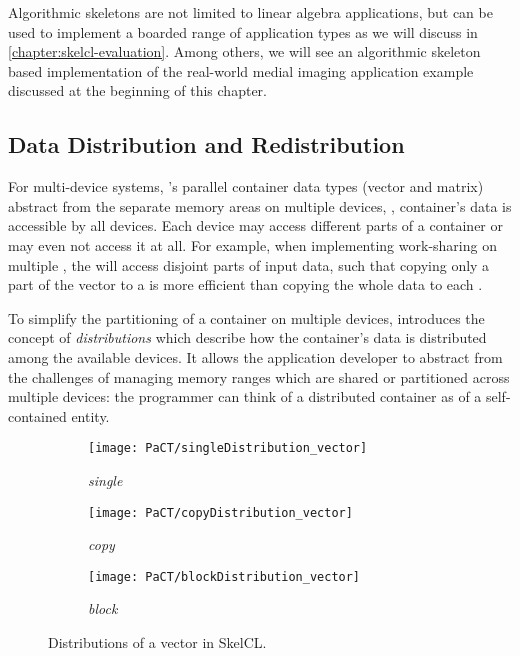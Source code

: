 \noindent
Algorithmic skeletons are not limited to linear algebra applications, but can be used to implement a boarded range of application types as we will discuss in \autoref{chapter:skelcl-evaluation}.
Among others, we will see an algorithmic skeleton based implementation of the real-world medial imaging application example discussed at the beginning of this chapter.


\subsection{Data Distribution and Redistribution}
\label{section:skelcl-programming-model:distribution}

For multi-device systems, \SkelCL's parallel container data types (vector and matrix) abstract from the separate memory areas on multiple \OpenCL devices, \ie, container's data is accessible by all devices.
Each device may access different parts of a container or may even not access it at all.
For example, when implementing work-sharing on multiple \GPUs, the \GPUs will access disjoint parts of input data, such that copying only a part of the vector to a \GPU is more efficient than copying the whole data to each \GPU.

To simplify the partitioning of a container on multiple devices, \SkelCL introduces the concept of \emph{distributions} which describe how the container's data is distributed among the available devices.
It allows the application developer to abstract from the challenges of managing memory ranges which are shared or partitioned across multiple devices: the programmer can think of a distributed container as of a self-contained entity.



\begin{figure}[tb]
  \centering
  \begin{subfigure}{.3\textwidth}
    \texttt{[image: PaCT/singleDistribution\_vector]}
    \caption{\emph{single}}
    \label{fig:distributions:single}
  \end{subfigure}
  \hfill
  \begin{subfigure}{.3\textwidth}
    \texttt{[image: PaCT/copyDistribution\_vector]}
    \caption{\emph{copy}}
    \label{fig:distributions:copy}
  \end{subfigure}
  \hfill
  \begin{subfigure}{.3\textwidth}
    \texttt{[image: PaCT/blockDistribution\_vector]}
    \caption{\emph{block}}
    \label{fig:distributions:block}
  \end{subfigure}
  \caption{Distributions of a vector in SkelCL.}
  \label{fig:distributions}
  \bigskip
\end{figure}


